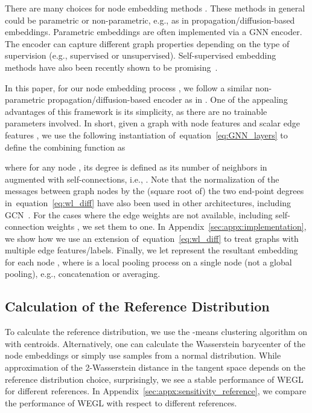 \documentclass[table]{article} \usepackage{iclr2021_conference,times}
\def\eqref#1{equation~\ref{#1}}
\begin{document}
There are many choices for node embedding methods \citep{chami2020machine}. These methods in general could be parametric or non-parametric, e.g., as in propagation/diffusion-based embeddings. Parametric embeddings are often implemented via a GNN encoder. The encoder can capture different graph properties depending on the type of supervision (e.g., supervised or unsupervised). Self-supervised embedding methods have also been recently shown to be promising~\citep{Hu*2020Strategies}.

In this paper, for our node embedding process , we follow a similar non-parametric propagation/diffusion-based encoder as in \citep{togninalli2019wasserstein}. One of the appealing advantages of this framework is its simplicity, as there are no trainable parameters involved. In short, given a graph  with node features  and scalar edge features , we use the following instantiation of~\eqref{eq:GNN_layers} to define the combining function as

where for any node , its degree  is defined as its number of neighbors in  augmented with self-connections, i.e., . Note that the normalization of the messages between graph nodes by the (square root of) the two end-point degrees in~\eqref{eq:wl_diff} have also been used in other architectures, including GCN~\citep{kipf2016semi}. For the cases where the edge weights are not available, including self-connection weights , we set them to one. In Appendix~\ref{sec:appx:implementation}, we show how we use an extension of~\eqref{eq:wl_diff} to treat graphs with multiple edge features/labels. Finally, we let  represent the resultant embedding for each node , where  is a local pooling process on a single node (not a global pooling), e.g., concatenation or averaging.

\vspace{-0.05in}
\subsection{Calculation of the Reference Distribution}\label{sub:template}
\vspace{-0.05in}

To calculate the reference distribution, we use the -means clustering algorithm on  with  centroids. Alternatively, one can calculate the Wasserstein barycenter \citep{cuturi2014fast} of the node embeddings or simply use  samples from a normal distribution. While approximation of the 2-Wasserstein distance in the tangent space depends on the reference distribution choice, surprisingly, we see a stable performance of WEGL for different references. 
In Appendix~\ref{sec:appx:sensitivity_reference}, we compare the performance of WEGL with respect to different references.
\end{document}
